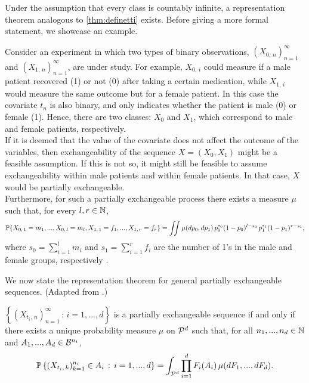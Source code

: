 Under the assumption that every class is countably infinite, a representation theorem analogous to \ref{thm:definetti} exists. Before giving a more formal statement, we showcase an example.


\begin{mdframed}[backgroundcolor=mygray] 
	\begin{example} 
		Consider an experiment in which two types of binary observations, $(X_{0, \, n})_{n=1}^{\infty}$ and $(X_{1, \, n})_{n=1}^{\infty}$, are under study. For example, $X_{0, \, i}$ could measure if a male patient recovered (1) or not (0) after taking a certain medication, while $X_{1, \, i}$ would measure the same outcome but for a female patient. In this case the covariate $t_n$ is also binary, and only indicates whether the patient is male (0) or female (1). Hence, there are two classes: $X_0$ and $X_1$, which correspond to male and female patients, respectively. \\
		
		If it is deemed that the value of the covariate does not affect the outcome of the variables, then exchangeability of the sequence $X = (X_0, X_1)$ might be a feasible assumption. If this is not so, it might still be feasible to assume exchangeability within male patients and within female patients. In that case, $X$ would be partially exchangeable. \\
		
		Furthermore, for such a partially exchangeable process there exists a measure $\mu$ such that, for every $l, r \in \mathbb{N}$,
				\begin{equation*}
			\mathbb{P} \{ X_{0, \, 1} = m_1, ..., X_{0, \, l} = m_l, X_{1, \, 1} = f_1, ..., X_{1, \, r} = f_r \} = \iint  \mu(dp_0, dp_1) \, p_0^{s_0} (1-p_0)^{l-s_0} \, p_1^{s_1} (1-p_1)^{r-s_1},
		\end{equation*}
		where $s_0 = \sum_{i=1}^l m_i$ and $s_1 = \sum_{i=1}^r f_i$ are the number of 1's in the male and female groups, respectively \cite[][p.~112-113]{Diaconis:1988:PartialExchang}.
	\end{example}
\end{mdframed}

We now state the representation theorem for general partially exchangeable sequences. (Adapted from \cite[][p.~69]{CamerlenghiEtAl:2019:partial_exchang_hierarchical}.)


\begin{theorem} \label{thm:definetti_partial}
	$\left\{ (X_{t_i, \, n})_{n=1}^{\infty} \, : \, i=1, ..., d \right\}$ is a partially exchangeable sequence if and only if there exists a unique probability measure $\mu$ on $\mathcal{P}^d$ such that, for all $n_1, ..., n_d \in \mathbb{N}$ and $A_1, ..., A_d \in \mathcal{B}^{n_i}$,
	\begin{equation} \label{eq:definetti_partial_thm}
		\mathbb{P} \left\{ (X_{t_i, \, k})_{k=1}^{n_i} \in A_i \, : \, i=1, ..., d  \right\} = \int_{\mathcal{P}^d}  \prod_{i=1}^d F_i(A_i) \, \mu(dF_1, ..., dF_d).
	\end{equation}
\end{theorem}



